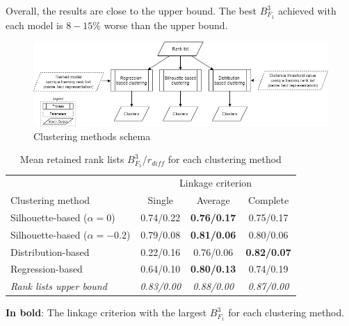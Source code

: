Overall, the results are close to the upper bound.
The best $B^{3}_{F_1}$ achieved with each model is $8-15\%$ worse than the upper bound.

\begin{figure}
  \centering
  \caption{Clustering methods schema}
  \label{fig:schema-clustering}
  \includegraphics[width=1\linewidth]{img/schema-clustering.png}
\end{figure}

\begin{table}[t]
  \centering
  \caption{Mean retained rank lists $B^{3}_{F_1}$/$r_{diff}$ for each clustering method}
  \label{tab:clustering_evaluation_summary}
  \begin{tabular}{l c c c}
    \toprule
                                       & \multicolumn{3}{c}{Linkage criterion} \\
    Clustering method                  & Single         & Average            & Complete \\
    \midrule
    Silhouette-based ($\alpha = 0$)    & 0.74/0.22      & \textbf{0.76/0.17} & 0.75/0.17 \\
    Silhouette-based ($\alpha = -0.2$) & 0.79/0.08      & \textbf{0.81/0.06} & 0.80/0.06 \\
    Distribution-based                 & 0.22/0.16      & 0.76/0.06          & \textbf{0.82/0.07} \\
    Regression-based                   & 0.64/0.10      & \textbf{0.80/0.13} & 0.74/0.19 \\
    \midrule
    \textit{Rank lists upper bound}    & \textit{0.83/0.00} & \textit{0.88/0.00} & \textit{0.87/0.00} \\
    \bottomrule
  \end{tabular}

  \vspace{0.2cm}
  \textbf{In bold}: The linkage criterion with the largest $B^{3}_{F_1}$ for each clustering method.
\end{table}
